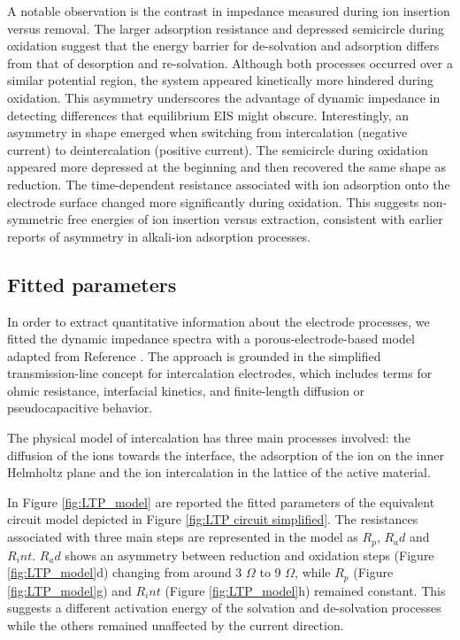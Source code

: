 A notable observation is the contrast in impedance measured during ion insertion versus removal. The larger adsorption resistance and depressed semicircle during oxidation suggest that the energy barrier for de-solvation and adsorption differs from that of desorption and re-solvation. Although both processes occurred over a similar potential region, the system appeared kinetically more hindered during oxidation. This asymmetry underscores the advantage of dynamic impedance in detecting differences that equilibrium EIS might obscure.
Interestingly, an asymmetry in shape emerged when switching from intercalation (negative current) to deintercalation (positive current). The semicircle during oxidation appeared more depressed at the beginning and then recovered the same shape as reduction. The time-dependent resistance associated with ion adsorption onto the electrode surface changed more significantly during oxidation. This suggests non-symmetric free energies of ion insertion versus extraction, consistent with earlier reports of asymmetry in alkali-ion adsorption processes.

\subsection{Fitted parameters}
In order to extract quantitative information about the electrode processes, we fitted the dynamic impedance spectra with a porous-electrode-based model adapted from Reference \cite{scarpioniElectrochemicalImpedanceSpectroscopy2023a}. The approach is grounded in the simplified transmission-line concept for intercalation electrodes, which includes terms for ohmic resistance, interfacial kinetics, and finite-length diffusion or pseudocapacitive behavior.

The physical model of intercalation has three main processes involved: the diffusion of the ions towards the interface, the adsorption of the ion on the inner Helmholtz plane and the ion intercalation in the lattice of the active material. 

In Figure \ref{fig:LTP_model} are reported the fitted parameters of the equivalent circuit model depicted in Figure \ref{fig:LTP circuit simplified}.
The resistances associated with three main steps are represented in the model as $R_p$, $R_ad$ and $R_int$.
$R_ad$ shows an asymmetry between reduction and oxidation steps (Figure \ref{fig:LTP_model}d) changing from around 3 $\Omega$ to 9 $\Omega$, while
$R_p$ (Figure \ref{fig:LTP_model}g) and $R_int$ (Figure \ref{fig:LTP_model}h) remained constant.
This suggests a different activation energy of the solvation and de-solvation processes while the others remained unaffected by the current direction.

